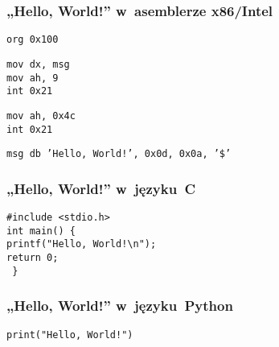 \documentclass[10pt,t]{beamer}
\begin{document}
\begin{frame}
  \frametitle{„Hello, World!” w~asemblerze x86/Intel
    \parencite{Anonymous-Hello-World-in-x86-Assembly-Language}}


  \texttt{org 0x100} \\
  \vspace{0.8em}

  \texttt{mov dx, msg} \\
  \texttt{mov ah, 9} \\
  \texttt{int 0x21} \\
  \vspace{0.8em}

  \texttt{mov ah, 0x4c} \\
  \texttt{int 0x21} \\
  \vspace{0.8em}

  \texttt{msg db 'Hello, World!', 0x0d, 0x0a, '\$'}

\end{frame}





\begin{frame}
  \frametitle{„Hello, World!” w~języku~C}


  \texttt{\#include <stdio.h>} \\
  \vspace{0.8em}
  \texttt{int main() \{ } \\
  \hphantom{aaaa} \texttt{printf("Hello, World!\textbackslash n");} \\
  \vspace{0.8em}
  \vspace{0.8em}
  \vspace{0.8em}
  \vspace{0.8em}
  \hphantom{aaaa} \texttt{return 0;} \\
  \texttt{ \} }

\end{frame}





\begin{frame}
  \frametitle{„Hello, World!” w~języku~Python}


  \texttt{print("Hello, World!")}

\end{frame}
\end{document}
